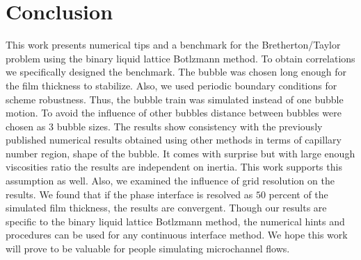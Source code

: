 \documentclass{article}
\begin{document}
\section{Conclusion}
This work presents numerical tips and a benchmark for the
Bretherton/Taylor problem using the binary liquid lattice Botlzmann method. To obtain correlations
we specifically designed the benchmark. The bubble was chosen long enough for the film thickness to
stabilize. Also, we used periodic boundary conditions for scheme robustness. Thus, the bubble
train was simulated instead of one bubble motion. To avoid the influence of other bubbles
distance between bubbles were chosen as $3$ bubble sizes. The
results show consistency with the previously published numerical results obtained
using other methods in terms of capillary number region, shape of the bubble. It comes with surprise
but with large enough viscosities ratio the results are independent on inertia. This work supports
this assumption as well. Also, we examined the influence of grid resolution on the results. We found
that if the phase interface is resolved as $50$ percent of the simulated film thickness, the results
are convergent. Though  our results are specific to the binary liquid lattice
Botlzmann method, the numerical hints and procedures can be used for any
continuous interface method.  We hope this work will prove to be valuable for
people simulating microchannel flows.


\end{document}
